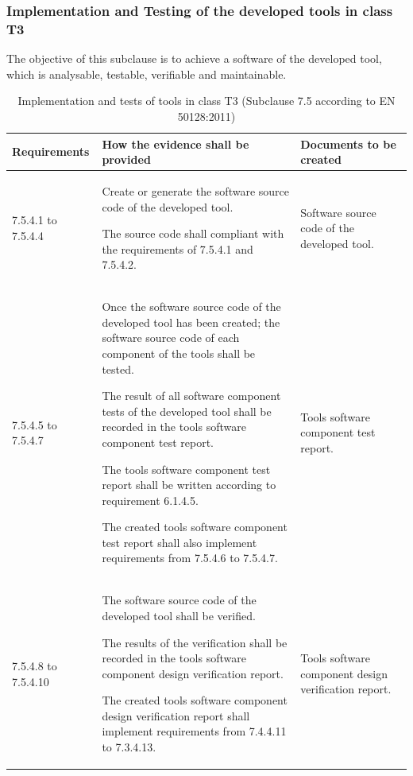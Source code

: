 \documentclass{template/openetcs_report}
\begin{document}
\subsubsection{Implementation and Testing of the developed tools in class T3}
\begin{flushleft}
The objective of this subclause is to achieve a software of the developed tool, which is analysable, testable, verifiable and maintainable.
\end{flushleft}
{\footnotesize\sffamily\centering
\begin{longtable}{|p{2cm}|p{9cm}|p{3cm}|}
\caption{Implementation and tests of tools in class T3 (Subclause 7.5 according to EN 50128:2011)}\\
\hline
\bfseries Requirements & \bfseries How the evidence shall be provided & \bfseries Documents to be created\\
\hline
\hline
\endhead
\hline
\endfoot

7.5.4.1 to 7.5.4.4 & Create or generate the software source code of the developed tool.

The source code shall compliant with the requirements of 7.5.4.1 and 7.5.4.2.
& Software source code of the developed tool.\\ 
\hline
7.5.4.5 to 7.5.4.7 & Once the software source code of the developed tool has been created; the software source code of each component of the tools shall be tested.

The result of all software component tests of the developed tool shall be recorded in the tools software component test report.

The tools software component test report shall be written according to requirement 6.1.4.5.

The created tools software component test report shall also implement requirements from 7.5.4.6 to 7.5.4.7.
& Tools software component test report.\\ 
\hline
7.5.4.8 to 7.5.4.10 & The software source code of the developed tool shall be verified.

The results of the verification shall be recorded in the tools software component design verification report.

The created tools software component design verification report shall implement requirements from 7.4.4.11 to 7.3.4.13.
& Tools software component design verification report.\\ 
\hline
\end{longtable}}
\end{document}
